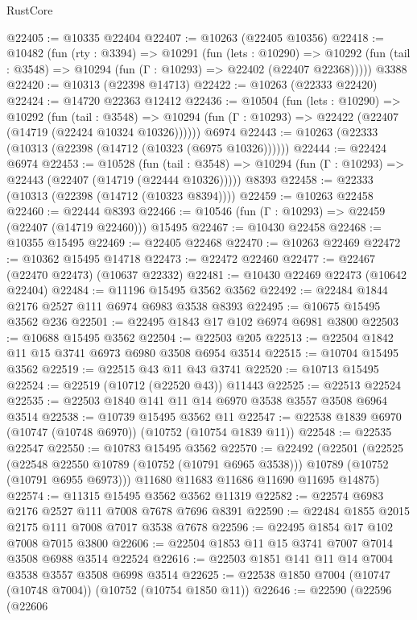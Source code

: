 \begin{lexlean}{RustCore}
\begin{coremodule}
@22405 := @10335 @22404
@22407 := @10263 (@22405 @10356)
@22418 := @10482
    (fun (rty : @3394) =>
    @10291
      (fun (lets : @10290) =>
      @10292 (fun (tail : @3548) => @10294 (fun (Γ : @10293) => @22402 (@22407 @22368)))))
    @3388
@22420 := @10313 (@22398 @14713)
@22422 := @10263 (@22333 @22420)
@22424 := @14720 @22363 @12412
@22436 := @10504
    (fun (lets : @10290) =>
    @10292
      (fun (tail : @3548) =>
      @10294 (fun (Γ : @10293) => @22422 (@22407 (@14719 (@22424 @10324 @10326))))))
    @6974
@22443 := @10263 (@22333 (@10313 (@22398 (@14712 (@10323 (@6975 @10326))))))
@22444 := @22424 @6974
@22453 := @10528
    (fun (tail : @3548) => @10294 (fun (Γ : @10293) => @22443 (@22407 (@14719 (@22444 @10326)))))
    @8393
@22458 := @22333 (@10313 (@22398 (@14712 (@10323 @8394))))
@22459 := @10263 @22458
@22460 := @22444 @8393
@22466 := @10546 (fun (Γ : @10293) => @22459 (@22407 (@14719 @22460))) @15495
@22467 := @10430 @22458
@22468 := @10355 @15495
@22469 := @22405 @22468
@22470 := @10263 @22469
@22472 := @10362 @15495 @14718
@22473 := @22472 @22460
@22477 := @22467 (@22470 @22473) (@10637 @22332)
@22481 := @10430 @22469 @22473 (@10642 @22404)
@22484 := @11196 @15495 @3562 @3562
@22492 := @22484 @1844 @2176 @2527 @111 @6974 @6983 @3538 @8393
@22495 := @10675 @15495 @3562 @236
@22501 := @22495 @1843 @17 @102 @6974 @6981 @3800
@22503 := @10688 @15495 @3562
@22504 := @22503 @205
@22513 := @22504 @1842 @11 @15 @3741 @6973 @6980 @3508 @6954 @3514
@22515 := @10704 @15495 @3562
@22519 := @22515 @43 @11 @43 @3741
@22520 := @10713 @15495
@22524 := @22519 (@10712 (@22520 @43)) @11443
@22525 := @22513 @22524
@22535 := @22503 @1840 @141 @11 @14 @6970 @3538 @3557 @3508 @6964 @3514
@22538 := @10739 @15495 @3562 @11
@22547 := @22538 @1839 @6970 (@10747 (@10748 @6970)) (@10752 (@10754 @1839 @11))
@22548 := @22535 @22547
@22550 := @10783 @15495 @3562
@22570 := @22492
    (@22501
      (@22525
        (@22548 @22550 @10789 (@10752 (@10791 @6965 @3538)))
        @10789
        (@10752 (@10791 @6955 @6973)))
      @11680
      @11683
      @11686
      @11690
      @11695
      @14875)
@22574 := @11315 @15495 @3562 @3562 @11319
@22582 := @22574 @6983 @2176 @2527 @111 @7008 @7678 @7696 @8391
@22590 := @22484 @1855 @2015 @2175 @111 @7008 @7017 @3538 @7678
@22596 := @22495 @1854 @17 @102 @7008 @7015 @3800
@22606 := @22504 @1853 @11 @15 @3741 @7007 @7014 @3508 @6988 @3514 @22524
@22616 := @22503 @1851 @141 @11 @14 @7004 @3538 @3557 @3508 @6998 @3514
@22625 := @22538 @1850 @7004 (@10747 (@10748 @7004)) (@10752 (@10754 @1850 @11))
@22646 := @22590
    (@22596
      (@22606

\end{coremodule}
\end{lexlean}

